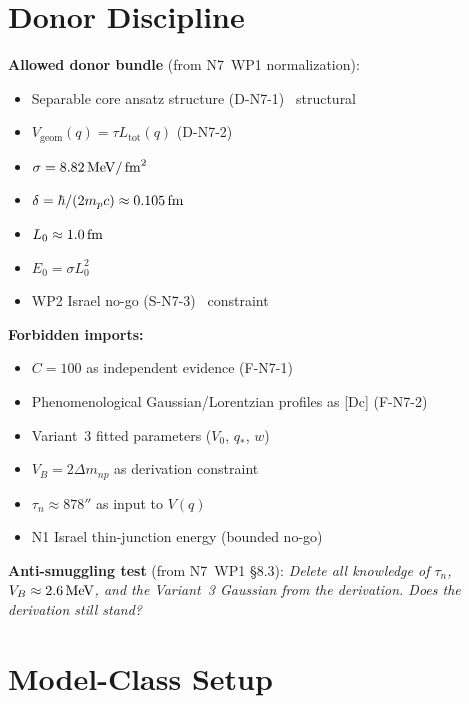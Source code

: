\section{Donor Discipline}
\label{sec:P2N7:donors}

\textbf{Allowed donor bundle} (from N7~WP1 normalization):
\begin{itemize}
    \item Separable core ansatz structure (D-N7-1) \tagDc\ structural
    \item $V_{\mathrm{geom}}(q) = \tau L_{\mathrm{tot}}(q)$ (D-N7-2)
          \tagDc
    \item $\sigma = 8.82\,\mathrm{MeV}/\,\mathrm{fm}^2$ \tagDc
    \item $\delta = \hbar/(2m_p c) \approx 0.105\,\mathrm{fm}$ \tagI
    \item $L_0 \approx 1.0\,\mathrm{fm}$ \tagI
    \item $E_0 = \sigma L_0^2$ \tagDc
    \item WP2 Israel no-go (S-N7-3) \tagDc\ constraint
\end{itemize}

\textbf{Forbidden imports:}
\begin{itemize}
    \item $C = 100$ as independent evidence (F-N7-1)
    \item Phenomenological Gaussian/Lorentzian profiles as [Dc] (F-N7-2)
    \item Variant~3 fitted parameters ($V_0$, $q_*$, $w$)
    \item $V_B = 2\Delta m_{np}$ as derivation constraint
    \item $\tau_n \approx 878\second$ as input to $V(q)$
    \item N1 Israel thin-junction energy (bounded no-go)
\end{itemize}

\textbf{Anti-smuggling test} (from N7~WP1 \S8.3):
\emph{Delete all knowledge of $\tau_n$, $V_B \approx 2.6\,\mathrm{MeV}$, and the
Variant~3 Gaussian from the derivation. Does the derivation still stand?}

\section{Model-Class Setup}
\label{sec:P2N7:model}

